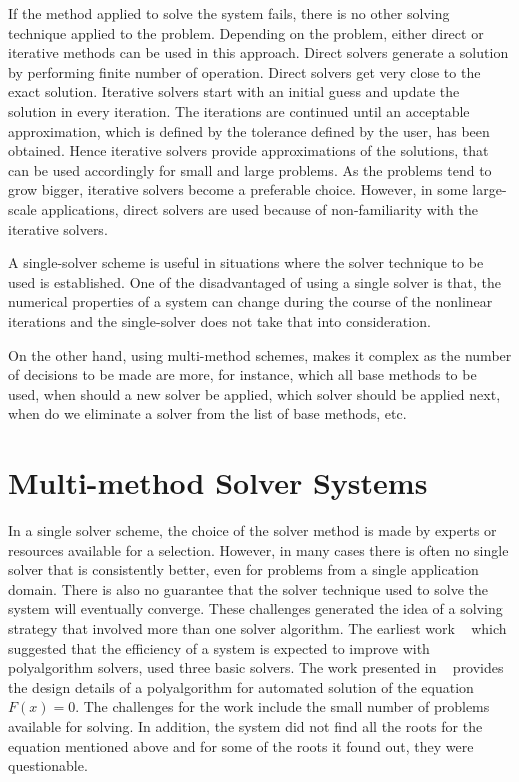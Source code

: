 If the method applied to solve the system fails, there is no other solving technique applied to the problem. Depending on the problem, either direct or iterative methods can be used in this approach. Direct solvers generate a solution by performing finite number of operation. Direct solvers get very close to the exact solution. Iterative solvers start with an initial guess and update the solution in every iteration. The iterations are continued until an acceptable approximation, which is defined by the tolerance defined by the user, has been obtained. Hence iterative solvers provide approximations of the solutions, that can be used accordingly for small and large problems. As the problems tend to grow bigger, iterative solvers become a preferable choice. However, in some large-scale applications, direct solvers are used because of non-familiarity with the iterative solvers. 

A single-solver scheme is useful in situations where the solver technique to be used is established. One of the disadvantaged of using a single solver is that, the numerical properties of a system can change during the course of the nonlinear iterations and the single-solver does not take that into consideration.

On the other hand, using multi-method schemes, makes it complex as the number of decisions to be made are more, for instance, which all base methods to be used, when should a new solver be applied, which solver should be applied next, when do we eliminate a solver from the list of base methods, etc. 

\section{Multi-method Solver Systems} 
In a single solver scheme, the choice of the solver method is made by experts or resources available for a selection. However, in many cases there is often no single solver that is consistently better, even for problems from a single application domain. There is also no guarantee that the solver technique used to solve the system will eventually converge. These challenges generated the idea of a solving strategy that involved more than one solver algorithm. The earliest work ~\cite{earliest1,earliest2} which suggested that the efficiency of a system is expected to improve with polyalgorithm solvers, used three basic solvers. The work presented in ~\cite{earliest2} provides the design details of a polyalgorithm for automated solution of the equation $F(x) = 0$. The challenges for the work include the small number of problems available for solving. In addition, the system did not find all the roots for the equation mentioned above and for some of the roots it found out, they were questionable.

